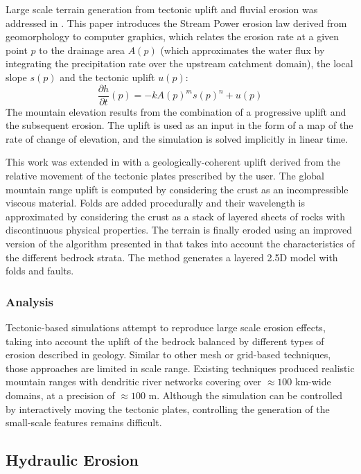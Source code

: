 \documentclass{article}
\begin{document}
Large scale terrain generation from tectonic uplift and fluvial erosion was addressed in \cite{CBC16}. This paper introduces the Stream Power erosion law derived from geomorphology \cite{WT99} to computer graphics, which relates the erosion rate at a given point $p$ to the drainage area $A(p)$ (which approximates the water flux by integrating the precipitation rate over the upstream catchment domain), the local slope $s(p)$ and the tectonic uplift $u(p)$:
\[
\frac{\partial h}{\partial t}(p) = -k A(p)^m s(p)^n + u(p)
\]
The mountain elevation results from the combination of a progressive uplift and the subsequent erosion. The uplift is used as an input in the form of a map of the rate of change of elevation, and the simulation is solved implicitly in linear time.

This work was extended in \cite{CCB18} with a geologically-coherent uplift derived from the relative movement of the tectonic plates prescribed by the user. The global mountain range uplift is computed by considering the crust as an incompressible viscous material. Folds are added procedurally and their wavelength is approximated by considering the crust as a stack of layered sheets of rocks with discontinuous physical properties. The terrain is finally eroded using an improved version of the algorithm presented in \cite{CBC16} that takes into account the characteristics of the different bedrock strata. The method generates a layered 2.5D model with folds and faults.

\subsubsection{Analysis}

Tectonic-based simulations attempt to reproduce large scale erosion effects, taking into account the uplift of the bedrock balanced by different types of erosion described in geology. Similar to other mesh or grid-based techniques, those approaches are limited in scale range. Existing techniques produced realistic mountain ranges with dendritic river networks covering over $\approx 100$ km-wide domains, at a precision of $\approx 100$ m. Although the simulation can be controlled by interactively moving the tectonic plates, controlling the generation of the small-scale features remains difficult.

\subsection{Hydraulic Erosion}
\end{document}
